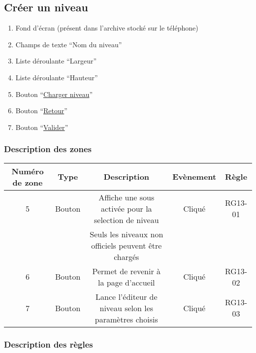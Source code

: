 \documentclass{report}
\begin{document}
				
\newpage
	
	\subsection{Créer un niveau}
		
		\hypertarget{Creer niveau}{}
		\label{Creer niveau}
			
		\begin{center}
			
		\end{center}

		\begin{enumerate}
		  \item Fond d'écran (présent dans l'archive stocké sur le téléphone)
		  \item Champs de texte ``Nom du niveau''
		  \item Liste déroulante ``Largeur''
		  \item Liste déroulante ``Hauteur''
		  \item Bouton ``\hyperlink{Charger}{Charger niveau}''
		  \item Bouton ``\hyperlink{Accueil}{Retour}''
		  \item Bouton ``\hyperlink{Editeur}{Valider}''
		\end{enumerate}

		\subsubsection{Description des zones}
		
			\begin{tabular}{|c|c|c|c|c|} \hline
				Numéro de zone & Type  & Description & Evènement &	Règle \\\hline
				5 & Bouton & Affiche une sous activée pour la selection de niveau & Cliqué & RG13-01 \\
				  &        & Seuls les niveaux non officiels peuvent être chargés &        &         \\\hline
				6 & Bouton & Permet de revenir à la page d'accueil & Cliqué & RG13-02 \\\hline
				7 & Bouton & Lance l'éditeur de niveau selon les paramètres choisis & Cliqué & RG13-03 \\\hline 
			\end{tabular}
			
		\subsubsection{Description des règles}
\end{document}
